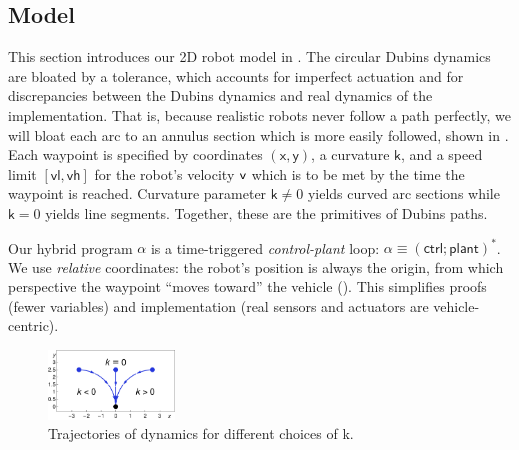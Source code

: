 \documentclass[12pt]{cmuthesis}
\theoremstyle{definition}
\theoremstyle{remark}
\newcommand{\xgvar}{\textsf{x}}
\newcommand{\ygvar}{\textsf{y}}
\newcommand{\kvar}{\textsf{k}}
\newcommand{\vlvar}{\textsf{vl}}
\newcommand{\vhvar}{\textsf{vh}}
\newcommand{\vvar}{{\sf v}\xspace}
\newcommand{\ctrl}{\textsf{ctrl}\xspace}
\newcommand{\plant}{\textsf{plant}\xspace}
\newcommand{\rref}[2][]{\prettyref{#2}}
\begin{document}
\subsection{Model}
\label{sec:planar-driving-system}
This section introduces our 2D robot model in \dL.
The circular Dubins dynamics are bloated by a tolerance, which accounts for imperfect actuation and for discrepancies between the Dubins dynamics and real dynamics of the implementation.
That is, because realistic robots never follow a path perfectly, we will bloat each arc to an annulus section which is more easily followed, shown in \rref{fig:ode1}.
Each waypoint is specified by coordinates $(\xgvar,\ygvar)$, a curvature $\kvar$, and a speed limit $[\vlvar,\vhvar]$ for the robot's velocity $\vvar$ which is to be met by the time the waypoint is reached.
Curvature parameter $\kvar \neq 0 $ yields curved arc sections while $\kvar=0$ yields line segments.
Together, these are the primitives of Dubins paths.

Our hybrid program $\alpha$ is a time-triggered \emph{control-plant} loop: $\alpha\equiv(\ctrl;\plant)^*$.
We use \emph{relative} coordinates: the robot's position is always the origin, from which perspective the waypoint ``moves toward'' the vehicle (\rref{fig:ode1}).
This simplifies proofs (fewer variables) and implementation (real sensors and actuators are vehicle-centric).
\begin{figure}[h!tb]
\centering
\includegraphics[width=0.3\textwidth]{graphics/fig-ode1.pdf}
\caption{Trajectories of dynamics for different choices of \kvar.}
\label{fig:ode1}
\end{figure}
\end{document}
